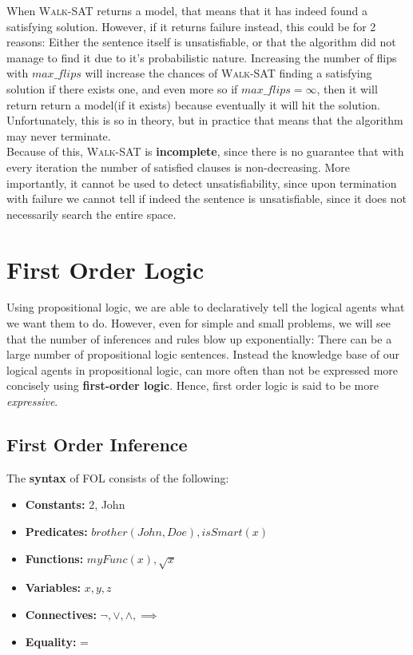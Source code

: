 \documentclass[12pt]{article}
\begin{document}
When \textsc{Walk-SAT} returns a model, that means that it has indeed found a satisfying solution. However, if it returns failure instead, this could be for 2 reasons: Either the sentence itself is unsatisfiable, or that the algorithm did not manage to find it due to it's probabilistic nature. Increasing the number of flips with $max\_flips$ will increase the chances of \textsc{Walk-SAT} finding a satisfying solution if there exists one, and even more so if $max\_flips = \infty$, then it will return return a model(if it exists) because eventually it will hit the solution. Unfortunately, this is so in theory, but in practice that means that the algorithm may never terminate.\\

Because of this, \textsc{Walk-SAT} is \textbf{incomplete}, since there is no guarantee that with every iteration the number of satisfied clauses is non-decreasing. More importantly, it cannot be used to detect unsatisfiability, since upon termination with failure we cannot tell if indeed the sentence is unsatisfiable, since it does not necessarily search the entire space.

\section{First Order Logic}

Using propositional logic, we are able to declaratively tell the logical agents what we want them to do. However, even for simple and small problems, we will see that the number of inferences and rules blow up exponentially: There can be a large number of propositional logic sentences. Instead the knowledge base of our logical agents in propositional logic, can more often than not be expressed more concisely using \textbf{first-order logic}. Hence, first order logic is said to be more \textit{expressive}.

\subsection{First Order Inference}

The \textbf{syntax} of FOL consists of the following:

\begin{itemize}
\item \textbf{Constants:} $2$, John
\item \textbf{Predicates:} $brother(John, Doe), isSmart(x)$
\item \textbf{Functions:} $myFunc(x), \sqrt{x}$
\item \textbf{Variables:} $x, y, z$
\item \textbf{Connectives:} $\lnot, \lor, \land, \implies$
\item \textbf{Equality:} =
\end{itemize}
\end{document}
